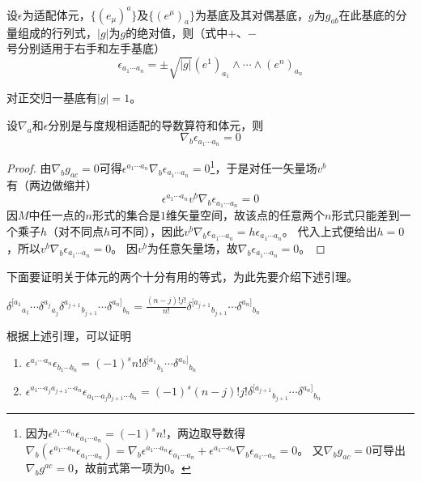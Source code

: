 \begin{theorem}
    设$\epsilon$为适配体元，$\{(e_\mu)^a\}$及$\{(e^\mu)_a\}$为基底及其对偶基底，$g$为$g_{ab}$在此基底的分量组成的行列式，$|g|$为$g$的绝对值，则（式中$+$、$-$号分别适用于右手和左手基底）
    $$\epsilon_{a_1 \cdots a_n} = \pm\sqrt{|g|}(e^1)_{a_1} \wedge \cdots \wedge (e^n)_{a_n}$$
\end{theorem}

\begin{note}
    对正交归一基底有$|g| = 1$。
\end{note}

\begin{theorem}
    设$\nabla_a$和$\epsilon$分别是与度规相适配的导数算符和体元，则
    $$\nabla_b\epsilon_{a_1 \cdots a_n} = 0$$
\end{theorem}

\begin{proof}
    由$\nabla_bg_{ac} = 0$可得$\epsilon^{a_1 \cdots a_n}\nabla_b\epsilon_{a_1 \cdots a_n} = 0$\footnote{
        因为$\epsilon^{a_1 \cdots a_n}\epsilon_{a_1 \cdots a_n} = (-1)^sn!$，两边取导数得$\nabla_b(\epsilon^{a_1 \cdots a_n}\epsilon_{a_1 \cdots a_n}) = \nabla_b\epsilon^{a_1 \cdots a_n}\epsilon_{a_1 \cdots a_n} + \epsilon^{a_1 \cdots a_n}\nabla_b\epsilon_{a_1 \cdots a_n} = 0$。
        又$\nabla_bg_{ac} = 0$可导出$\nabla_bg^{ac} = 0$，故前式第一项为0。
    }，于是对任一矢量场$v^b$有（两边做缩并）
    $$\epsilon^{a_1 \cdots a_n}v^b\nabla_b\epsilon_{a_1 \cdots a_n} = 0$$
    因$M$中任一点的$n$形式的集合是$1$维矢量空间，故该点的任意两个$n$形式只能差到一个乘子$h$（对不同点$h$可不同），因此$v^b\nabla_b\epsilon_{a_1 \cdots a_n} = h\epsilon_{a_1 \cdots a_n}$。
    代入上式便给出$h = 0$，所以$v^b\nabla_b\epsilon_{a_1 \cdots a_n} = 0$。
    因$v^b$为任意矢量场，故$\nabla_b\epsilon_{a_1 \cdots a_n} = 0$。
\end{proof}

下面要证明关于体元的两个十分有用的等式，为此先要介绍下述引理。

\begin{theorem}
    $\delta^{[a_1}{}_{a_1} \cdots \delta^{a_j}{}_{a_j}\delta^{a_{j + 1}}{}_{b_{j + 1}} \cdots \delta^{a_n]}{}_{b_n} = \displaystyle\frac{(n - j)!j!}{n!}\delta^{[a_{j + 1}}{}_{b_{j + 1}} \cdots \delta^{a_n]}{}_{b_n}$
\end{theorem}

根据上述引理，可以证明

\begin{theorem}
    \begin{enumerate}[（a）]
        \item $\epsilon^{a_1 \cdots a_n}\epsilon_{b_1 \cdots b_n} = (-1)^sn!\delta^{[a_1}{}_{b_1} \cdots \delta^{a_n]}{}_{b_n}$
        \item $\epsilon^{a_1 \cdots a_j a_{j + 1} \cdots a_n}\epsilon_{a_1 \cdots a_j b_{j + 1} \cdots b_n} = (-1)^s(n - j)!j!\delta^{[a_{j + 1}}{}_{b_{j + 1}} \cdots \delta^{a_n]}{}_{b_n}$
    \end{enumerate}
\end{theorem}


